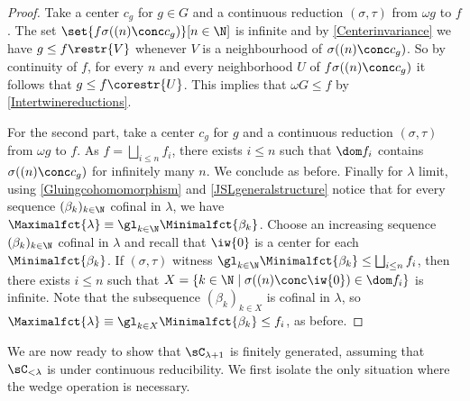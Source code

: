 %
%
\begin{proof}
Take a center $c_g$ for $g\in G$ and a continuous reduction $(\sigma,\tau)$ from $\omega g$ to $f$. The set $\set{f\sigma((n)\conc c_g)}[n\in\N]$ is infinite and by \cref{Centerinvariance} we have $g\leq f\restr{V}$ whenever $V$ is a neighbourhood of $\sigma((n)\conc c_g)$. So by continuity of $f$, for every $n$ and every neighborhood $U$ of $f\sigma((n)\conc c_g)$ it follows that $g\leq f\corestr{U}$. This implies that $\omega G\leq f$ by \cref{Intertwinereductions}.

For the second part, take a center $c_g$ for $g$ and a continuous reduction $(\sigma,\tau)$ from $\omega g$ to $f$. As $f=\bigsqcup_{i\leq n}f_i$, there exists $i\leq n$ such that $\dom f_i$ contains $\sigma((n)\conc c_g)$ for infinitely many $n$. We conclude as before. Finally for $\lambda$ limit, using \cref{Gluingcohomomorphism} and \cref{JSLgeneralstructure} notice that for every sequence $(\beta_k)_{k\in \N}$ cofinal in $\lambda$, we have $\Maximalfct{\lambda}\equiv \gl_{k\in \N} \Minimalfct{\beta_k}$. Choose an increasing sequence $(\beta_k)_{k\in \N}$ cofinal in $\lambda$ and recall that $\iw{0}$ is a center for each $\Minimalfct{\beta_k}$. If $(\sigma,\tau)$ witness $\gl_{k\in\N} \Minimalfct{\beta_k}\leq \bigsqcup_{i\leq n}f_i$, then there exists $i\leq n$ such that $X=\{k\in\N \mid \sigma((n)\conc \iw{0}) \in \dom f_i\}$ is infinite. Note that the subsequence $(\beta_k)_{k\in X}$ is cofinal in $\lambda$, so $\Maximalfct{\lambda}\equiv \gl_{k\in X} \Minimalfct{\beta_k}\leq f_i$, as before. 
\end{proof}


We are now ready to show that $\sC_{\lambda+1}$ is finitely generated, assuming that $\sC_{<\lambda}$ is \bqo{} under continuous reducibility.  We first isolate the only situation where the wedge operation is necessary.%

